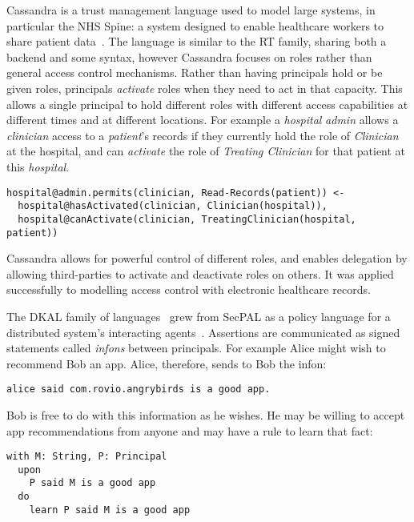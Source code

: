 \documentclass[thesis.tex]{subfiles}
\begin{document}
Cassandra is a trust management language used to model large systems,
in particular the NHS Spine: a system designed to enable healthcare
workers to share patient
data~\cite{becker_cassandra:_2004,becker_cassandra:_2004-1}.  The
language is similar to the RT family, sharing both a backend and some
syntax, however Cassandra focuses on roles rather than general access
control mechanisms.  Rather than having principals hold or be given
roles, principals \emph{activate} roles when they need to act in that
capacity.  This allows a single principal to hold different roles with
different access capabilities at different times and at different
locations.  For example a \emph{hospital} \emph{admin} allows a
\emph{clinician} access to a \emph{patient}'s records if they
currently hold the role of \emph{Clinician} at the hospital, and can
\emph{activate} the role of \emph{Treating Clinician} for that patient
at this \emph{hospital}.

\begin{lstlisting}
hospital@admin.permits(clinician, Read-Records(patient)) <-
  hospital@hasActivated(clinician, Clinician(hospital)),
  hospital@canActivate(clinician, TreatingClinician(hospital, patient))
\end{lstlisting}

Cassandra allows for powerful control of different roles, and enables
delegation by allowing third-parties to activate and deactivate roles
on others.  It was applied successfully to modelling access control
with electronic healthcare records.

The DKAL family of
languages~\cite{jeannin_dkal*:_2013,gurevich_dkal:_2008,yuri_gurevich_dkal2---simplified_2009}
grew from SecPAL as a policy language for a distributed system's
interacting agents~\cite{blass_introduction_2012}.  Assertions are
communicated as signed statements called \emph{infons} between
principals.  For example Alice might wish to recommend Bob an app.
Alice, therefore, sends to Bob the infon:

\begin{lstlisting}
alice said com.rovio.angrybirds is a good app.
\end{lstlisting}

Bob is free to do with this information as he wishes.  He may be
willing to accept app recommendations from anyone and may have a rule
to learn that fact:

\begin{lstlisting}
with M: String, P: Principal
  upon
    P said M is a good app
  do
    learn P said M is a good app
\end{lstlisting}
\end{document}
